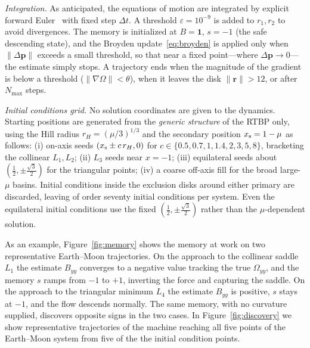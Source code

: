 \documentclass[aip,preprint,amsmath,amssymb,floatfix]{revtex4-2}
\begin{document}
{\it Integration.}
As anticipated, the equations of motion are integrated by explicit forward Euler~\cite{sauer2018numerical} with fixed step $\Delta t$. A threshold 
$\varepsilon=10^{-9}$ is added to $r_1,r_2$ to avoid divergences. The memory is initialized at
$B=\mathbf{1}$, $s=-1$ (the safe descending state), and the Broyden
update~\eqref{eq:broyden} is applied only when $\lVert\Delta\mathbf p\rVert$ exceeds
a small threshold, so that near a fixed point---where $\Delta\mathbf p\to0$---the estimate
simply stops. A trajectory ends when the magnitude of the gradient is below a threshold ($\lVert\nabla\Omega\rVert<\theta$), when it
leaves the disk $\lVert\mathbf r\rVert>12$, or after $N_{\max}$ steps.

{\it Initial conditions grid.}
No solution coordinates are given to the dynamics. Starting positions are
generated from the \emph{generic structure} of the RTBP only, using the Hill radius
$r_H=(\mu/3)^{1/3}$ and the secondary position $x_{\rm s}=1-\mu$ as follows:
(i) on-axis seeds $(x_{\rm s}\pm c\,r_H,0)$ for
$c\in\{0.5,0.7,1,1.4,2,3,5,8\}$, bracketing the collinear $L_1,L_2$;
(ii) $L_3$ seeds near $x=-1$;
(iii) equilateral seeds about $(\tfrac12,\pm\tfrac{\sqrt3}{2})$ for the triangular
points;
(iv) a coarse off-axis fill for the broad large-$\mu$ basins.
Initial conditions inside the exclusion disks around either primary are discarded, leaving of
order seventy initial conditions per system. Even the equilateral initial conditions use the fixed
$(\tfrac12,\pm\tfrac{\sqrt3}{2})$ rather than the $\mu$-dependent solution.


As an example, Figure~\ref{fig:memory} shows the memory at work on two representative Earth--Moon trajectories. On
the approach to the collinear saddle $L_1$ the estimate $B_{yy}$ converges to a
negative value tracking the true $\Omega_{yy}$, and the memory $s$ ramps from $-1$ to $+1$,
inverting the force and capturing the saddle. On the approach to the triangular
minimum $L_4$ the estimate $B_{yy}$ is positive, $s$ stays at $-1$, and the flow descends
normally. The same memory, with no curvature supplied, discovers opposite signs in
the two cases. In Figure~\ref{fig:discovery} we show representative 
trajectories of the machine reaching all five points of the Earth--Moon system from five of the 
the initial condition points.
\end{document}
